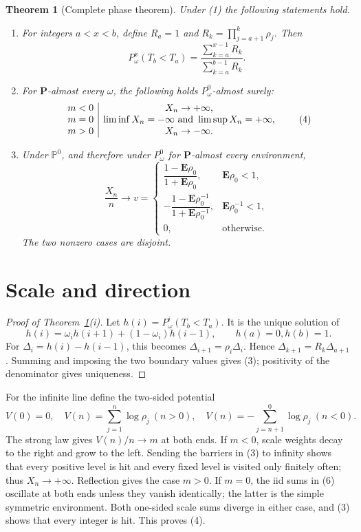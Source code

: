 \documentclass[10pt]{article}
\newtheorem{theorem}{Theorem}
\theoremstyle{remark}
\newcommand{\PP}{\mathbf P}
\newcommand{\EE}{\mathbf E}
\newcommand{\PA}{\mathbb P}
\begin{document}
\begin{theorem}[Complete phase theorem]\label{thm:main}
Under \emph{(1)} the following statements hold.
\begin{enumerate}[label=\textup{(\roman*)}]
\item For integers \(a<x<b\), define \(R_a=1\) and
\(R_k=\prod_{j=a+1}^{k}\rho_j\).  Then
\[
P_\omega^x(T_b<T_a)
=\frac{\sum_{k=a}^{x-1}R_k}{\sum_{k=a}^{b-1}R_k}.            \tag{3}
\]
\item For \(\PP\)-almost every \(\omega\), the following holds
\(P_\omega^0\)-almost surely:
\[
\begin{array}{c|c}
m<0&X_n\to+\infty,\\
m=0&\liminf X_n=-\infty\ \hbox{and}\ \limsup X_n=+\infty,\\
m>0&X_n\to-\infty.
\end{array}                                                   \tag{4}
\]
\item Under \(\PA^0\), and therefore under \(P_\omega^0\) for
\(\PP\)-almost every environment,
\[
\frac{X_n}{n}\longrightarrow v
=\begin{cases}
\dfrac{1-\EE\rho_0}{1+\EE\rho_0},&\EE\rho_0<1,\\[5pt]
-\dfrac{1-\EE\rho_0^{-1}}{1+\EE\rho_0^{-1}},
   &\EE\rho_0^{-1}<1,\\[5pt]
0,&\text{otherwise}.
\end{cases}                                                   \tag{5}
\]
The two nonzero cases are disjoint.
\end{enumerate}
\end{theorem}

\section{Scale and direction}

\begin{proof}[Proof of Theorem~\ref{thm:main}(i)]
Let \(h(i)=P_\omega^i(T_b<T_a)\).  It is the unique solution of
\[
h(i)=\omega_i h(i+1)+(1-\omega_i)h(i-1),\qquad h(a)=0, h(b)=1.
\]
For \(\Delta_i=h(i)-h(i-1)\), this becomes
\(\Delta_{i+1}=\rho_i\Delta_i\).  Hence
\(\Delta_{k+1}=R_k\Delta_{a+1}\).  Summing and imposing the two boundary
values gives (3); positivity of the denominator gives uniqueness.
\end{proof}

For the infinite line define the two-sided potential
\[
V(0)=0,\quad V(n)=\sum_{j=1}^{n}\log\rho_j\ (n>0),\quad
V(n)=-\sum_{j=n+1}^{0}\log\rho_j\ (n<0).                    \tag{6}
\]
The strong law gives \(V(n)/n\to m\) at both ends.  If \(m<0\), scale
weights decay to the right and grow to the left.  Sending the barriers in (3)
to infinity shows that every positive level is hit and every fixed level is
visited only finitely often; thus \(X_n\to+\infty\).  Reflection gives the
case \(m>0\).  If \(m=0\), the iid sums in (6) oscillate at both ends unless
they vanish identically; the latter is the simple symmetric environment.
Both one-sided scale sums diverge in either case, and (3) shows that every
integer is hit.  This proves (4).
\end{document}
